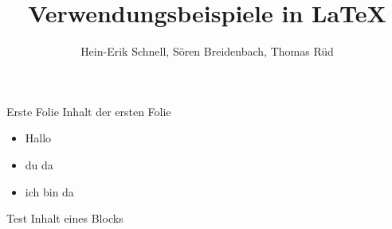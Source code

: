\documentclass{beamer}
\begin{document}
\title{Verwendungsbeispiele in \LaTeX}
\author{Hein-Erik Schnell, Sören Breidenbach, Thomas Rüd}

\frame{\titlepage}

\begin{frame}{Erste Folie}
	Inhalt der ersten Folie
	\begin{itemize}[<+->]
		\item Hallo
		\item<+-> du da
		\item<+> ich bin da
	\end{itemize}
\begin{block}{Test}
	Inhalt eines Blocks
\end{block}
\end{frame}

\end{document}
